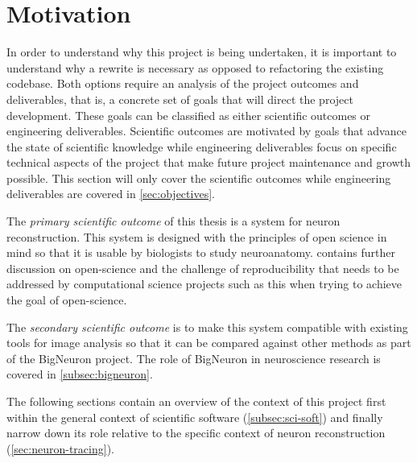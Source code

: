 \section{Motivation}\label{sec:motivation}

In order to understand why this project is being undertaken, it is
important to understand why a rewrite is necessary as opposed to refactoring
the existing codebase. Both options require an analysis of the project
outcomes and deliverables, that is, a concrete set of goals that will direct the project
development. These goals can be classified as either scientific
outcomes or engineering deliverables. Scientific outcomes are motivated by goals that
advance the state of scientific knowledge while engineering deliverables focus
on specific technical aspects of the project that make future project
maintenance and growth possible. This section will only cover the scientific
outcomes while engineering deliverables are covered in \cref{sec:objectives}.

The \emph{primary scientific outcome} of this thesis is a system for
neuron reconstruction. This system is designed with the principles of open
science in mind so that it is usable by biologists to study
neuroanatomy.  contains further
discussion on open-science and the challenge of
reproducibility that needs to be addressed by computational science projects
such as this when trying to achieve the goal of open-science.

The \emph{secondary scientific outcome} is to make this system
compatible with existing tools for image analysis so that it can
be compared against other methods as part of the BigNeuron
project. The role of BigNeuron in neuroscience research is covered
in \cref{subsec:bigneuron}.

The following sections contain an overview of the context of this project
first within the general context of scientific software (\cref{subsec:sci-soft})
and finally narrow down its role relative to the specific context
of neuron reconstruction (\cref{sec:neuron-tracing}).


